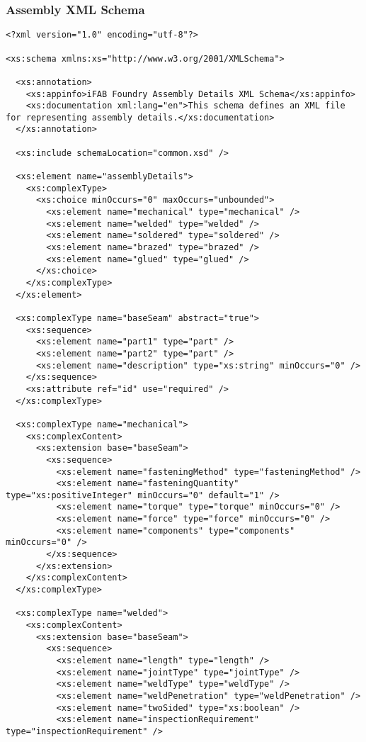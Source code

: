 \subsubsection{Assembly XML Schema}
\begin{lstlisting}
<?xml version="1.0" encoding="utf-8"?>

<xs:schema xmlns:xs="http://www.w3.org/2001/XMLSchema">

  <xs:annotation>
    <xs:appinfo>iFAB Foundry Assembly Details XML Schema</xs:appinfo>
    <xs:documentation xml:lang="en">This schema defines an XML file for representing assembly details.</xs:documentation>
  </xs:annotation>

  <xs:include schemaLocation="common.xsd" />

  <xs:element name="assemblyDetails">
    <xs:complexType>
      <xs:choice minOccurs="0" maxOccurs="unbounded">
        <xs:element name="mechanical" type="mechanical" />
        <xs:element name="welded" type="welded" />
        <xs:element name="soldered" type="soldered" />
        <xs:element name="brazed" type="brazed" />
        <xs:element name="glued" type="glued" />
      </xs:choice>
    </xs:complexType>
  </xs:element>

  <xs:complexType name="baseSeam" abstract="true">
    <xs:sequence>
      <xs:element name="part1" type="part" />
      <xs:element name="part2" type="part" />
      <xs:element name="description" type="xs:string" minOccurs="0" />
    </xs:sequence>
    <xs:attribute ref="id" use="required" />
  </xs:complexType>

  <xs:complexType name="mechanical">
    <xs:complexContent>
      <xs:extension base="baseSeam">
        <xs:sequence>
          <xs:element name="fasteningMethod" type="fasteningMethod" />
          <xs:element name="fasteningQuantity" type="xs:positiveInteger" minOccurs="0" default="1" />
          <xs:element name="torque" type="torque" minOccurs="0" />
          <xs:element name="force" type="force" minOccurs="0" />
          <xs:element name="components" type="components" minOccurs="0" />
        </xs:sequence>
      </xs:extension>
    </xs:complexContent>
  </xs:complexType>

  <xs:complexType name="welded">
    <xs:complexContent>
      <xs:extension base="baseSeam">
        <xs:sequence>
          <xs:element name="length" type="length" />
          <xs:element name="jointType" type="jointType" />
          <xs:element name="weldType" type="weldType" />
          <xs:element name="weldPenetration" type="weldPenetration" />
          <xs:element name="twoSided" type="xs:boolean" />
          <xs:element name="inspectionRequirement" type="inspectionRequirement" />


\end{lstlisting}
